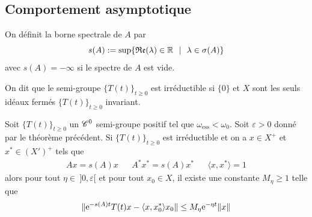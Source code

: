 \subsection{Comportement asymptotique}
\begin{frame}
    \begin{definition}
        On définit la \textcolor{astral}{borne spectrale de $A$} par 
        \begin{equation*}
            s(A):= \sup\{\Re (\lambda) \in \bbR \ \ | \ \ \lambda \in \sigma(A)\}
        \end{equation*}
        avec $s(A)=-\infty$ si le spectre de $A$ est vide.
    \end{definition}
    \pause
    \begin{definition}
        On dit que le semi-groupe $\big\{T(t)\big\}_{t \geq 0}$ est \textcolor{astral}{irréductible} si $\{0\}$ et $X$ sont les seuls idéaux fermés $\big\{T(t)\big\}_{t \geq 0}$ invariant.
    \end{definition}
    \pause
    \begin{theorem}
        Soit $\big\{T(t)\big\}_{t \geq 0}$ un $\mathscr{C}^0$ semi-groupe positif tel que $\omega_{\text{ess}} < \omega_0$. Soit $\varepsilon >0$ donné par le théorème précédent. Si $\big\{T(t)\big\}_{t \geq 0}$ est irréductible et on a $x \in X^+$ et $x^* \in (X')^+$ tels que 
        \begin{equation*}
            \begin{array}{ccccc}
                Ax = s(A)x && A^*x^* = s(A)x^* && \langle x,x^*\rangle =1
            \end{array}
        \end{equation*}
        alors pour tout $\eta \in \ ]0,\varepsilon[$ et pour tout $x_0 \in X$, il existe une constante $M_\eta \geq 1$ telle que 
        \begin{equation*}
            \|\mathrm{e}^{-s(A)t}T(t)x - \langle x,x_0^*\rangle x_0\| \leq M_\eta \mathrm{e}^{-\eta t}\|x\|
        \end{equation*}
    \end{theorem}
\end{frame}


